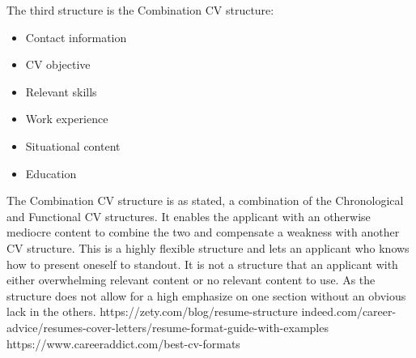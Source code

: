 The third structure is the Combination CV structure:
\begin{itemize}
   \item  Contact information
   \item  CV objective
   \item  Relevant skills
   \item  Work experience
   \item  Situational content
   \item  Education
   \end{itemize}
The Combination CV structure is as stated, a combination of the Chronological and Functional CV structures. 
It enables the applicant with an otherwise mediocre content to combine the two and compensate a weakness with another CV structure.
This is a highly flexible structure and lets an applicant who knows how to present oneself to standout.
It is not a structure that an applicant with either overwhelming relevant content or no relevant content to use.
As the structure does not allow for a high emphasize on one section without an obvious lack in the others.
   https://zety.com/blog/resume-structure
   indeed.com/career-advice/resumes-cover-letters/resume-format-guide-with-examples
   https://www.careeraddict.com/best-cv-formats
\clearpage

